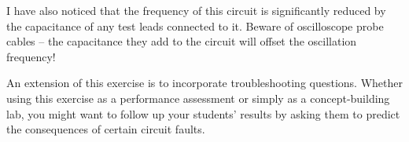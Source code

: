 I have also noticed that the frequency of this circuit is significantly reduced by the capacitance of any test leads connected to it.  Beware of oscilloscope probe cables -- the capacitance they add to the circuit will offset the oscillation frequency!

An extension of this exercise is to incorporate troubleshooting questions.  Whether using this exercise as a performance assessment or simply as a concept-building lab, you might want to follow up your students' results by asking them to predict the consequences of certain circuit faults.




